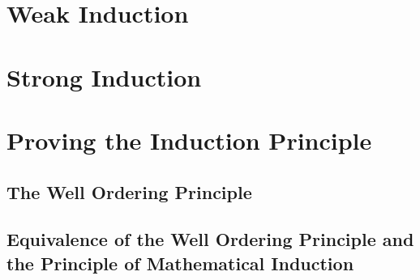 \section{Weak Induction}


\section{Strong Induction}


\section{Proving the Induction Principle}
\subsection{The Well Ordering Principle}

\subsection{Equivalence of the Well Ordering Principle and the Principle of Mathematical Induction}

